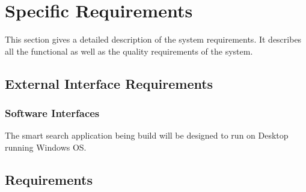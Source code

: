 \documentclass[a4paper,10pt]{article}
\begin{document}
	
	\newpage
	\section{Specific Requirements}
This section gives a detailed description of the system requirements. It describes all the functional as well as the quality requirements of the system.

	\subsection{External Interface Requirements}

            \subsubsection{Software Interfaces}
The smart search application being build will be designed to run on Desktop running Windows OS.

	\subsection{Requirements}
\end{document}
